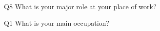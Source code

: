 \begin{description}%
\item{Q8} What is your major role at your place of work?%
\item{Q1} What is your main occupation?%
\end{description}%
